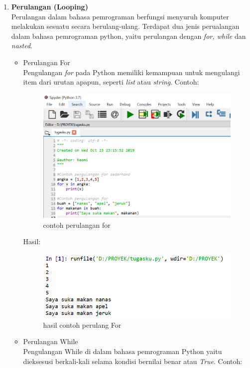 \begin{enumerate}
\item \textbf{Perulangan (Looping)}\\
Perulangan dalam bahasa pemrograman berfungsi menyuruh komputer melakukan sesuatu secara berulang-ulang. Terdapat dua jenis perualangan dalam bahasa pemrograman python, yaitu perulangan dengan \textit{for, while} dan \textit{nasted}.
\begin{itemize}
\item Perulangan For\\
Pengulangan \textit{for} pada Python memiliki kemampuan untuk mengulangi item dari urutan apapun, seperti \textit{list} atau \textit{string}. Contoh:
\begin{figure}[!htbp]
\centering
\includegraphics[width=13cm]{gambar2/for.png}
\caption{contoh perulangan for}
\end{figure}
\newpage
Hasil:
\begin{figure}[!htbp]
\centering
\includegraphics[width=13cm]{gambar2/for1.png}
\caption{hasil contoh perulang For}
\end{figure}
\newpage
\item Perulangan While\\
Pengulangan While di dalam bahasa pemrograman Python yaitu dieksesusi berkali-kali selama kondisi bernilai benar atau \textit{True}. Contoh:

\end{itemize}
\end{enumerate}
